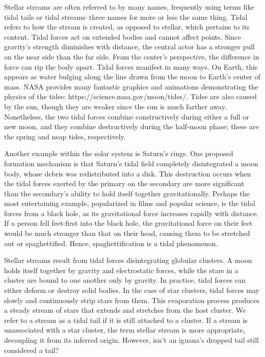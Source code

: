 Stellar streams are often referred to by many names, frequently using terms like tidal tails or tidal streams–three names for more or less the same thing. Tidal refers to how the stream is created, as opposed to stellar, which pertains to its content. Tidal forces act on extended bodies and cannot affect points. Since gravity's strength diminishes with distance, the central actor has a stronger pull on the near side than the far side. From the center's perspective, the difference in force can rip the body apart. Tidal forces manifest in many ways. On Earth, this appears as water bulging along the line drawn from the moon to Earth's center of mass. NASA provides many fantastic graphics and animations demonstrating the physics of the tides: https://science.nasa.gov/moon/tides/. Tides are also caused by the sun, though they are weaker since the sun is much farther away. Nonetheless, the two tidal forces combine constructively during either a full or new moon, and they combine destructively during the half-moon phase; these are the spring and neap tides, respectively.

Another example within the solar system is Saturn's rings. One proposed formation mechanism is that Saturn's tidal field completely disintegrated a moon body, whose debris was redistributed into a disk. This destruction occurs when the tidal forces exerted by the primary on the secondary are more significant than the secondary's ability to hold itself together gravitationally. Perhaps the most entertaining example, popularized in films and popular science, is the tidal forces from a black hole, as its gravitational force increases rapidly with distance. If a person fell feet-first into the black hole, the gravitational force on their feet would be much stronger than that on their head, causing them to be stretched out or spaghettified. Hence, spaghettification is a tidal phenomenon. 

Stellar streams result from tidal forces disintegrating globular clusters. A moon holds itself together by gravity and electrostatic forces, while the stars in a cluster are bound to one another only by gravity. In practice, tidal forces can either deform or destroy solid bodies. In the case of star clusters, tidal forces may slowly and continuously strip stars from them. This evaporation process produces a steady stream of stars that extends and stretches from the host cluster. We refer to a stream as a tidal tail if it is still attached to a cluster. If a stream is unassociated with a star cluster, the term stellar stream is more appropriate, decoupling it from its inferred origin. However, isn't an iguana's dropped tail still considered a tail?
 


